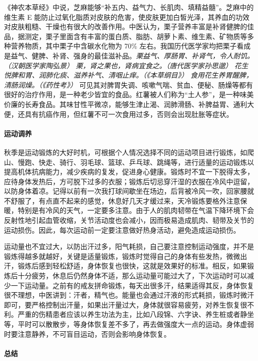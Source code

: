 《神农本草经》中说，芝麻能够“补五内、益气力、长肌肉、填精益髓”。芝麻中的维生素 E 能防止过氧化脂质对皮肤的危害，使皮肤更加白皙光泽，其养血的功效对皮肤粗糙、干燥也有很大的改善作用。中医认为，栗子营养丰富是补肾健脾的佳品，据测定，栗子里面含有丰富的蛋白质、脂肪、胡萝卜素、维生素、矿物质等多种营养物质，其中栗子中含碳水化物为 70\% 左右。我国历代医学家均把栗子看成是益气、健脾、补肾、强身的最佳滋补品。\textit{栗益气、厚肠胃、补肾气，令人耐饥。（汉朝医学家陶弘景）} \textit{栗，肾之果也，肾病宜食之。（唐代医学家孙思邈）} \textit{花生悦脾和胃、润肺化痰、滋养补气、清咽止痒。（《本草纲目》）} \textit{食用花生养胃醒脾，清肠润燥。（《药性考》）} 可见其对脾胃失调、咳嗽气喘、贫血、便秘、肠燥等都有很好的治疗作用，是一种老少皆宜的食品。红薯被人们称为“土人参”，是一种味美价廉的长寿食品。其味甘性平微凉，能够生津止渴、润肺滑肠、补脾益胃、通利大便，还具有抗癌作用，但红薯不可一次食用过多，否则会出现肚胀等症状。

\paragraph{运动调养}

秋季是运动锻炼的大好时机，可根据个人情况选择不同的运动项目进行锻炼，如爬山、慢跑、快走、骑行、羽毛球、篮球、乒乓球、跳绳等，进行适量的运动锻炼以提高机体抗病能力，减少疾病的复发，促进身心健康。锻炼时不宜一下脱得太多，应待身体发热后，方可脱下过多的衣服；锻炼后切忌穿汗湿的衣服在冷风中逗留，以防身体着凉。记得以前有一次我打球间歇坐在场边，后背被冷风一吹，回家腰就不舒服了，有点直不起来的感觉，休息好几天才缓过来，天冷锻炼要格外注意保暖，特别是有冷风的天气，一定要多注意。由于人的肌肉韧带在气温下降环境下会反射性地引起血管收缩，关节活动度也会减小，因而极易造成肌肉、韧带及关节的运动损伤。因此，每次运动前一定要注意做好热身活动，避免造成运动损伤。

运动量也不宜过大，以防出汗过多，阳气耗损，自己要注意控制运动强度，并不是锻炼得越多就越好，关键是适量锻炼，锻炼时觉得自己的身体有些发热，微微出汗，锻炼后感到轻松舒适，身体恢复也很快，这就是效果好的标准。相反，如果锻炼后十分疲劳，休息后仍然身体不适，那么运动量可能过大了，下次运动时可以减少一下运动量。之前有的戒友拼命锻炼，每天出很多汗，结果适得其反，身体恢复很不理想，中医讲到：汗者，精气也。能量也会通过汗液的形式耗损，锻炼时微汗即可，要严格控制出汗量，如果出汗量过大，身体就很容易疲劳，对养生恢复很不利。严重的伤精患者应该以养生功法为主，比如八段锦、六字诀、养生桩或者静坐等，平时可以散散步，等身体恢复差不多了，再去做强度大一点的运动。身体虚弱时要注意静养，不可盲目运动，否则会影响身体恢复。

\paragraph*{总结}


